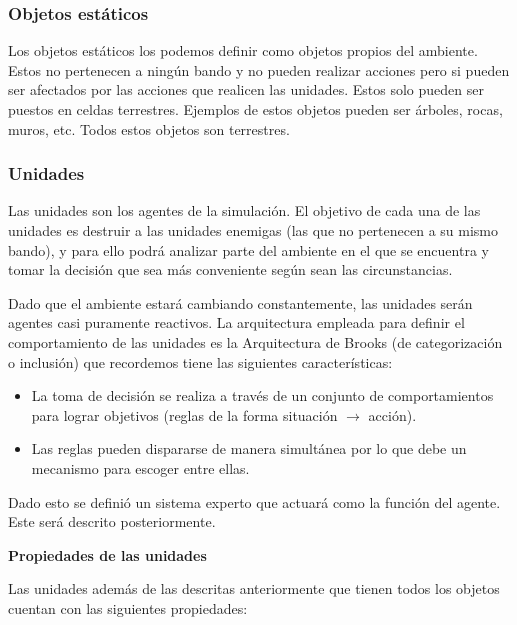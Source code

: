 \subsubsection{Objetos estáticos}

Los objetos estáticos los podemos definir como objetos propios del ambiente. Estos no pertenecen a ningún bando y no pueden realizar acciones pero si pueden ser afectados por las acciones que realicen las unidades. Estos solo pueden ser puestos en celdas terrestres. Ejemplos de estos objetos pueden ser árboles, rocas, muros, etc. Todos estos objetos son terrestres. 

\subsubsection{Unidades}

Las unidades son los agentes de la simulación. El objetivo de cada una de las unidades es destruir a las unidades enemigas (las que no pertenecen a su mismo bando), y para ello podrá analizar parte del ambiente en el que se encuentra y tomar la decisión que sea más conveniente según sean las circunstancias. 

Dado que el ambiente estará cambiando constantemente, las unidades serán agentes casi puramente reactivos. La arquitectura empleada para definir el comportamiento de las unidades es la Arquitectura de Brooks (de categorización o inclusión) que recordemos tiene las siguientes características: 

\begin{itemize}
	\item La toma de decisión se realiza a través de un conjunto de comportamientos para lograr objetivos (reglas de la forma situación $\rightarrow$ acción).
	\item Las reglas pueden dispararse de manera simultánea por lo que debe un mecanismo para escoger entre ellas.	
\end{itemize}

Dado esto se definió un sistema experto que actuará como la función del agente. Este será descrito posteriormente.

\textbf{Propiedades de las unidades}

Las unidades además de las descritas anteriormente que tienen todos los objetos cuentan con las siguientes propiedades:

